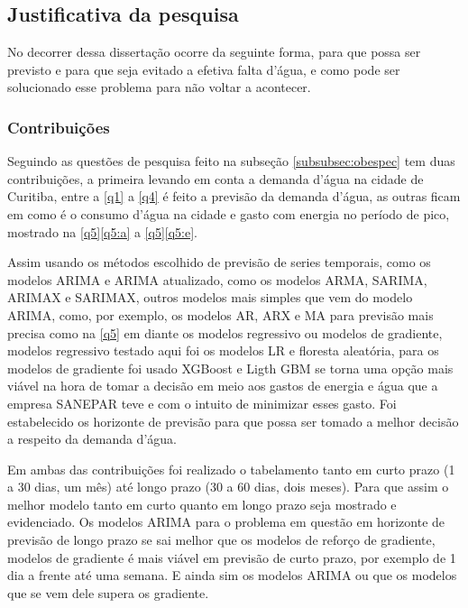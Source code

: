 \subsection{Justificativa da pesquisa} \label{subsec:justif}

No decorrer dessa dissertação ocorre da seguinte forma, para que possa ser previsto e para que seja evitado a efetiva falta d'água, e como pode ser solucionado esse problema para não voltar a acontecer.

\subsubsection{Contribui\c c\~oes} \label{subsubsec:Contribuição}

Seguindo as questões de pesquisa feito na subseção \ref{subsubsec:obespec} tem duas contribuições, a primeira levando em conta a demanda d'água na cidade de Curitiba, entre a \ref{q1} a \ref{q4} é feito a previsão da demanda d'água, as outras ficam em como é o consumo d'água na cidade e gasto com energia no período de pico, mostrado na \ref{q5}\ref{q5:a} a \ref{q5}\ref{q5:e}.

Assim usando os métodos escolhido de previsão de series temporais, como os modelos ARIMA e ARIMA atualizado, como os modelos ARMA, SARIMA, ARIMAX e SARIMAX, outros modelos mais simples que vem do modelo ARIMA, como, por exemplo, os modelos AR, ARX e MA para previsão mais precisa como na \ref{q5} em diante os modelos regressivo ou modelos de gradiente, modelos regressivo testado aqui foi os modelos LR e floresta aleatória, para os modelos de gradiente foi usado XGBoost e Ligth GBM se torna uma opção mais viável na hora de tomar a decisão em meio aos gastos de energia e água que a empresa SANEPAR teve e com o intuito de minimizar esses gasto. Foi estabelecido os horizonte de previsão para que possa ser tomado a melhor decisão a respeito da demanda d'água.

Em ambas das contribuições foi realizado o tabelamento tanto em curto prazo (1 a 30 dias, um mês) até longo prazo (30 a 60 dias, dois meses). Para que assim o melhor modelo tanto em curto quanto em longo prazo seja mostrado e evidenciado. Os modelos ARIMA para o problema em questão em horizonte de previsão de longo prazo se sai melhor que os modelos de reforço de gradiente, modelos de gradiente é mais viável em previsão de curto prazo, por exemplo de 1 dia a frente até uma semana. E ainda sim os modelos ARIMA ou que os modelos que se vem dele supera os gradiente.

